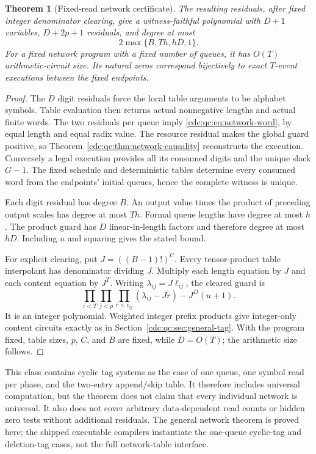 \documentclass[11pt,a4paper]{article}
\newtheorem{theorem}{Theorem}[section]
\theoremstyle{definition}
\theoremstyle{remark}
\begin{document}
\begin{theorem}[Fixed-read network certificate]\label{cdc:qc:thm:network-certificate}
The resulting residuals, after fixed integer denominator clearing, give a witness-faithful polynomial with $D+1$ variables, $D+2p+1$ residuals, and degree at most
\[
 2\max\{B,Th,hD,1\}.
\]
For a fixed network program with a fixed number of queues, it has $O(T)$ arithmetic-circuit size. Its natural zeros correspond bijectively to exact $T$-event executions between the fixed endpoints.
\end{theorem}
\begin{proof}
The $D$ digit residuals force the local table arguments to be alphabet symbols. Table evaluation then returns actual nonnegative lengths and actual finite words. The two residuals per queue imply \eqref{cdc:qc:eq:network-word}, by equal length and equal radix value. The resource residual makes the global guard positive, so Theorem~\ref{cdc:qc:thm:network-causality} reconstructs the execution. Conversely a legal execution provides all its consumed digits and the unique slack $G-1$. The fixed schedule and deterministic tables determine every consumed word from the endpoints' initial queues, hence the complete witness is unique.

Each digit residual has degree $B$. An output value times the product of preceding output scales has degree at most $Th$. Formal queue lengths have degree at most $h$. The product guard has $D$ linear-in-length factors and therefore degree at most $hD$. Including $u$ and squaring gives the stated bound.

For explicit clearing, put $J=((B-1)!)^C$. Every tensor-product table interpolant has denominator dividing $J$. Multiply each length equation by $J$ and each content equation by $J^T$. Writing $\lambda_{ij}=J\ell_{ij}$, the cleared guard is
\[
 \prod_{i<T}\prod_{j<p}\prod_{r<c_{ij}}(\lambda_{ij}-Jr)
      -J^D(u+1).
\]
It is an integer polynomial. Weighted integer prefix products give integer-only content circuits exactly as in Section~\ref{cdc:qc:sec:general-tag}. With the program fixed, table sizes, $p$, $C$, and $B$ are fixed, while $D=O(T)$; the arithmetic size follows.
\end{proof}

This class contains cyclic tag systems as the case of one queue, one symbol read per phase, and the two-entry append/skip table. It therefore includes universal computation, but the theorem does not claim that every individual network is universal. It also does not cover arbitrary data-dependent read counts or hidden zero tests without additional residuals. The general network theorem is proved here; the shipped executable compilers instantiate the one-queue cyclic-tag and deletion-tag cases, not the full network-table interface.
\end{document}
